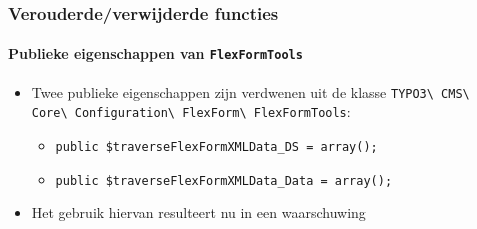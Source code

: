 \begin{frame}[fragile]
	\frametitle{Verouderde/verwijderde functies}
	\framesubtitle{Publieke eigenschappen van \texttt{FlexFormTools}}

	\begin{itemize}
		\item Twee publieke eigenschappen zijn verdwenen uit de klasse
			\texttt{TYPO3\textbackslash
				CMS\textbackslash
				Core\textbackslash
				Configuration\textbackslash
				FlexForm\textbackslash
				FlexFormTools}:

		\begin{itemize}
			\item \texttt{public \$traverseFlexFormXMLData\_DS = array();}
			\item \texttt{public \$traverseFlexFormXMLData\_Data = array();}
		\end{itemize}

		\item Het gebruik hiervan resulteert nu in een waarschuwing

	\end{itemize}

\end{frame}




